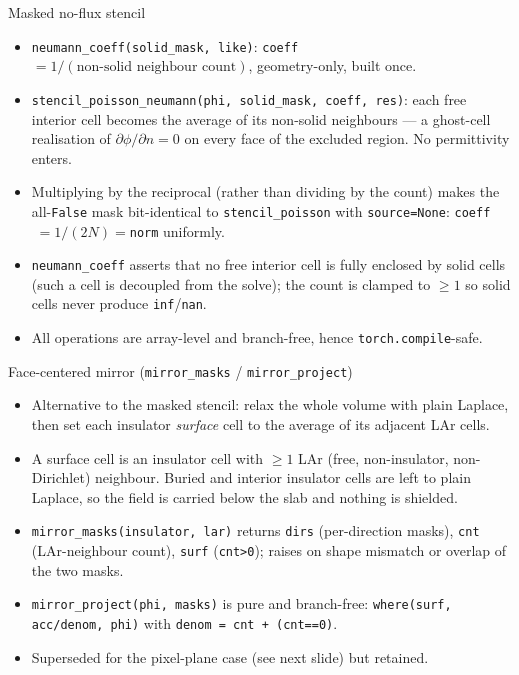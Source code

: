\documentclass[10pt,aspectratio=169]{beamer}
\newcommand{\ti}[1]{\texttt{\footnotesize #1}}
\begin{document}
\begin{frame}{Masked no-flux stencil}
  \begin{itemize}\small
  \item \ti{neumann\_coeff(solid\_mask, like)}: \ti{coeff} $=1/(\text{non-solid neighbour
        count})$, geometry-only, built once.
  \item \ti{stencil\_poisson\_neumann(phi, solid\_mask, coeff, res)}: each free interior cell
        becomes the average of its non-solid neighbours --- a ghost-cell realisation of
        $\partial\phi/\partial n=0$ on every face of the excluded region. No permittivity
        enters.
  \item Multiplying by the reciprocal (rather than dividing by the count) makes the
        all-\ti{False} mask bit-identical to \ti{stencil\_poisson} with \ti{source=None}:
        \ti{coeff}$\;=1/(2N)=$\ti{norm} uniformly.
  \item \ti{neumann\_coeff} asserts that no free interior cell is fully enclosed by solid
        cells (such a cell is decoupled from the solve); the count is clamped to $\ge1$ so
        solid cells never produce \ti{inf}/\ti{nan}.
  \item All operations are array-level and branch-free, hence \ti{torch.compile}-safe.
  \end{itemize}
\end{frame}

\begin{frame}{Face-centered mirror (\texttt{mirror\_masks} / \texttt{mirror\_project})}
  \begin{itemize}\small
  \item Alternative to the masked stencil: relax the whole volume with plain Laplace, then
        set each insulator \emph{surface} cell to the average of its adjacent LAr cells.
  \item A surface cell is an insulator cell with $\ge1$ LAr (free, non-insulator,
        non-Dirichlet) neighbour. Buried and interior insulator cells are left to plain
        Laplace, so the field is carried below the slab and nothing is shielded.
  \item \ti{mirror\_masks(insulator, lar)} returns \ti{dirs} (per-direction masks),
        \ti{cnt} (LAr-neighbour count), \ti{surf} (\ti{cnt>0}); raises on shape mismatch or
        overlap of the two masks.
  \item \ti{mirror\_project(phi, masks)} is pure and branch-free:
        \ti{where(surf, acc/denom, phi)} with \ti{denom = cnt + (cnt==0)}.
  \item Superseded for the pixel-plane case (see next slide) but retained.
  \end{itemize}
\end{frame}
\end{document}
